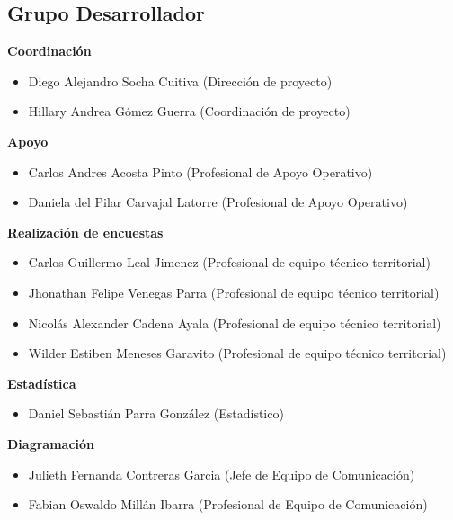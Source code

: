 \documentclass[
]{book}
\begin{document}
\hypertarget{grupo-desarrollador}{%
\subsection*{Grupo Desarrollador}\label{grupo-desarrollador}}

\textbf{Coordinación}

\begin{itemize}\item  Diego Alejandro Socha Cuitiva (Dirección de proyecto)\item  Hillary Andrea Gómez Guerra (Coordinación de proyecto)\end{itemize}

\textbf{Apoyo}

\begin{itemize}\item  Carlos Andres Acosta Pinto (Profesional de Apoyo Operativo)\item  Daniela del Pilar Carvajal Latorre (Profesional de Apoyo Operativo)\end{itemize}

\textbf{Realización de encuestas}

\begin{itemize}\item  Carlos Guillermo Leal Jimenez (Profesional de equipo técnico territorial)\item  Jhonathan Felipe Venegas Parra (Profesional de equipo técnico territorial)\item  Nicolás Alexander Cadena Ayala (Profesional de equipo técnico territorial)\item  Wilder Estiben Meneses Garavito (Profesional de equipo técnico territorial)\end{itemize}

\textbf{Estadística}

\begin{itemize}\item  Daniel Sebastián Parra González (Estadístico)\end{itemize}

\textbf{Diagramación}

\begin{itemize}\item  Julieth Fernanda Contreras Garcia (Jefe de Equipo de Comunicación)\item  Fabian Oswaldo Millán Ibarra (Profesional de Equipo de Comunicación)\end{itemize}
\end{document}
